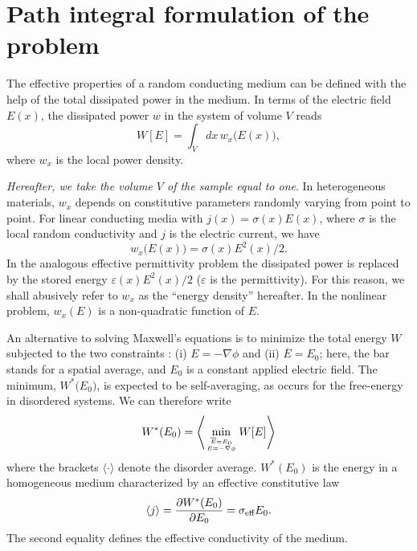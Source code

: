 \section{Path integral formulation of the problem}
\label{pifotp}
The effective properties of a random
conducting medium can be defined with the help of the
total dissipated power in the medium\cite{WILL86,SANC87,PONT92b}.
In terms of the electric field
$E(x)$, the dissipated power $w$ in the system of volume $V$ reads
\begin{equation}
W[E]=\int_V dx\,w_x\bigl(E(x)\bigr),
\end{equation}
where $w_x$ is the local power density.

{\em Hereafter, we take the volume $V$ of the sample equal to one}. In
heterogeneous materials, $w_x$ depends on constitutive
parameters randomly varying from point to point. For linear conducting
media with $j(x)=\sigma(x)E(x)$, where $\sigma$ is the local random
conductivity and $j$ is the electric current, we have
\begin{equation}
\label{linmed}
w_x\bigl(E(x)\bigr)=\sigma(x)E^2(x)/2.
\end{equation}
In the analogous effective
permittivity problem the dissipated power is replaced by the stored
energy $\varepsilon(x)E^2(x)/2$ ($\varepsilon$ is the
permittivity). For this reason, we shall abusively refer to $w_x$ as
the ``energy density'' hereafter. In the nonlinear problem, $w_x(E)$
is a non-quadratic function of $E$.

An alternative to solving Maxwell's equations is to minimize the total
energy $W$ subjected to the two constraints \cite{WILL86,SANC87}: (i) $E=- \nabla\phi$ and
(ii) $\overline{E}=E_0$; here, the bar stands for a spatial average,
and $E_0$ is a constant applied electric field. The
minimum, $W^*\bigl(E_0\bigr)$, is expected to be self-averaging, as
occurs for the free-energy in disordered systems. We can therefore write
\begin{equation}
\label{mini}
W^*(E_0)=\left\langle\mathop{\text{min}}_{\overline{E} =E_0 \atop{E=-\nabla\phi}} W[E]\right\rangle
\end{equation}
where the brackets $\langle\cdot\rangle$ denote the disorder average.
$W^*(E_0)$ is the energy in a homogeneous medium
characterized by an effective
constitutive law \cite{WILL86}
\begin{equation}
\label{constef}
\left\langle j\right\rangle={\partial W^*(E_0)\over \partial
E_0}=\sigma_{\text{eff}} E_0.
\end{equation}
The second equality defines the effective conductivity of the medium.

